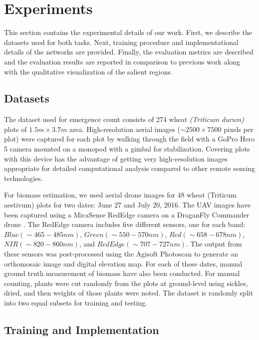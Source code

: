 \documentclass[10pt,twocolumn,letterpaper]{article}
\begin{document}
\section{Experiments}
\label{sec:experiments}

This section contains the experimental details of our work. First, we describe the datasets used for both tasks. Next, training procedure and implementational details of the networks are provided. Finally, the evaluation metrics are described and the evaluation results are reported in comparison to previous work along with the qualitative visualization of the salient regions.

\subsection{Datasets}
\label{sec:datasets}
The dataset used for emergence count consists of 274 wheat \textit{(Triticum durum)} plots of $1.5m\times3.7m$ area. High-resolution aerial images ($\sim2500\times7500$ pixels per plot) were captured for each plot by walking through the field with a GoPro Hero 5 camera \cite{gopro} mounted on a monopod with a gimbal for stabilization. Covering plots with this device has the advantage of getting very high-resolution images appropriate for detailed computational analysis compared to other remote sensing technologies.

For biomass estimation, we used aerial drone images for 48 wheat (Triticum aestivum) plots for two dates: June 27 and July 20, 2016. The UAV images have been captured using a MicaSense RedEdge camera \cite{micasense} on a DraganFly Commander drone \cite{draganfly}. The RedEdge camera includes five different sensors, one for each band: $Blue (\sim 465-485 nm)$, $Green (\sim 550-570 nm)$, $Red (\sim 658-678 nm)$, $NIR (\sim 820-860 nm)$, and $Red Edge (\sim 707-727 nm)$. The output from these sensors was post-processed using the Agisoft Photoscan \cite{agisoft} to generate an orthomosaic image and digital elevation map. For each of these dates, manual ground truth measurement of biomass have also been conducted. For manual counting, plants were cut randomly from the plots at ground-level using sickles, dried, and then weights of those plants were noted. The dataset is randomly split into two equal subsets for training and testing.

\subsection{Training and Implementation}
\end{document}
